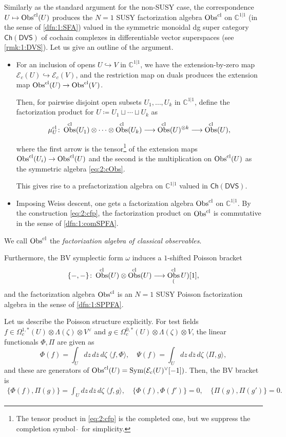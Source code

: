 \documentclass[final,reqno]{amsart}
\numberwithin{equation}{section}
\theoremstyle{definition}
\newcommand{\ol}{\overline}
\newcommand{\wh}{\widehat}
\newcommand{\ceq}{\coloneqq} %
\newcommand{\inj}{\hookrightarrow}
\newcommand{\lto}{\longrightarrow}
\newcommand{\mto}{\mapsto}
\newcommand{\tcl}{\textup{cl}}
\newcommand{\sC}{\mathbb{C}^{1|1}}
\newcommand{\clE}{\mathcal{E}}
\newcommand{\Ch}{\mathsf{Ch}}
\newcommand{\DVS}{\mathsf{DVS}}
\newcommand{\pair}[1]{\langle #1 \rangle}
\newcommand{\cObs}[1]{\mathop{\Obs^{\textup{cl}}_{#1}}}
\DeclareMathOperator{\Sym}{Sym}
\DeclareMathOperator{\Obs}{Obs}
\begin{document}
Similarly as the standard argument \cite{CG1,CG2} for the non-SUSY case, 
the correspondence $U \mto \cObs{}(U)$ produces 
the $N=1$ SUSY factorization algebra $\cObs{}$ on $\sC$ 
(in the sense of \cref{dfn:1:SFA})
valued in the symmetric monoidal dg super category $\Ch(\DVS)$
of cochain complexes in differentiable vector superspaces
(see \cref{rmk:1:DVS}).
Let us give an outline of the argument.
\begin{itemize}
\item
For an inclusion of opens $U \inj V$ in $\sC$, 
we have the extension-by-zero map $\clE_c(U) \inj \clE_c(V)$, 
and the restriction map on duals produces 
the extension map $\cObs{}(U) \to \cObs{}(V)$.

Then, for pairwise disjoint open subsets $U_1,\dotsc,U_k$ in $\sC$,  
define the factorization product for $U \ceq U_1 \sqcup \dotsb \sqcup U_k$ as
\begin{align}\label{eq:2:cfp}
 \mu^{\tcl}_U\colon 
 \cObs{}(U_1) \otimes \dotsb \otimes \cObs{}(U_k) \lto 
 \cObs{}(U)^{\otimes k} \lto \cObs{}(U),
\end{align}
where the first arrow is the tensor\footnote{The tensor product 
 in \eqref{eq:2:cfp} is the completed one, but we suppress 
 the completion symbol $\wh{\ }$ for simplicity.} of 
the extension maps $\cObs{}(U_i) \to \cObs{}(U)$
and the second is the multiplication on $\cObs{}(U)$ 
as the symmetric algebra \eqref{eq:2:cObs}.

This gives rise to a prefactorization algebra on $\sC$ valued in $\Ch(\DVS)$.

\item
Imposing Weiss descent, one gets a factorization algebra $\cObs{}$ on $\sC$.
By the construction \eqref{eq:2:cfp}, 
the factorization product on $\cObs{}$ is commutative 
in the sense of \cref{dfn:1:comSPFA}.
\end{itemize}
We call $\cObs{}$ the \emph{factorization algebra of classical observables}.

Furthermore, the BV symplectic form $\omega$ induces 
a $1$-shifted Poisson bracket
\[
 \{-,-\}\colon \cObs{}(U) \otimes \cObs{}(U) \lto \cObs(U)[1],
\]
and the factorization algebra $\cObs{}$ is an $N=1$ SUSY Poisson 
factorization algebra in the sense of \cref{dfn:1:SPPFA}.

Let us describe the Poisson structure explicitly.
For test fields 
$f\in\Omega_c^{1,*}(U) \otimes \Lambda(\zeta)\otimes V^\vee$ and 
$g\in\Omega_c^{0,*}(U) \otimes \Lambda(\zeta)\otimes V$, 
the linear functionals $\Phi,\Pi$ are given as
\[
 \Phi(f) = \int_U dz\,d\ol{z}\,d\zeta\;\pair{f,\Phi}, \quad 
 \Psi(f) = \int_U dz\,d\ol{z}\,d\zeta\;\pair{\Pi,g},
\]
and these are generators of $\cObs{}(U)=\Sym(\clE_c(U)^\vee[-1])$.
Then, the BV bracket is 
\begin{align}\label{eq:1:P0}
 \{\Phi(f),\Pi(g)\} = \int_U dz\,d\ol{z}\,d\zeta\;\pair{f,g}, \quad 
 \{\Phi(f),\Phi(f')\} =  0, \quad 
 \{\Pi(g),\Pi(g')\} =  0.
\end{align}
\end{document}
